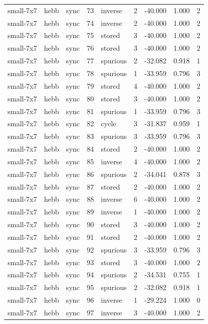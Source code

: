 \begin{tabular}{lllrlrrrr}
small-7x7 & hebb & sync & 73 & inverse & 2 & -40.000 & 1.000 & 2 \\
small-7x7 & hebb & sync & 74 & inverse & 2 & -40.000 & 1.000 & 2 \\
small-7x7 & hebb & sync & 75 & stored & 3 & -40.000 & 1.000 & 2 \\
small-7x7 & hebb & sync & 76 & stored & 3 & -40.000 & 1.000 & 2 \\
small-7x7 & hebb & sync & 77 & spurious & 2 & -32.082 & 0.918 & 1 \\
small-7x7 & hebb & sync & 78 & spurious & 1 & -33.959 & 0.796 & 3 \\
small-7x7 & hebb & sync & 79 & stored & 4 & -40.000 & 1.000 & 2 \\
small-7x7 & hebb & sync & 80 & stored & 3 & -40.000 & 1.000 & 2 \\
small-7x7 & hebb & sync & 81 & spurious & 1 & -33.959 & 0.796 & 3 \\
small-7x7 & hebb & sync & 82 & cycle & 3 & -31.837 & 0.959 & 1 \\
small-7x7 & hebb & sync & 83 & spurious & 3 & -33.959 & 0.796 & 3 \\
small-7x7 & hebb & sync & 84 & stored & 2 & -40.000 & 1.000 & 2 \\
small-7x7 & hebb & sync & 85 & inverse & 4 & -40.000 & 1.000 & 2 \\
small-7x7 & hebb & sync & 86 & spurious & 2 & -34.041 & 0.878 & 3 \\
small-7x7 & hebb & sync & 87 & stored & 2 & -40.000 & 1.000 & 2 \\
small-7x7 & hebb & sync & 88 & inverse & 6 & -40.000 & 1.000 & 2 \\
small-7x7 & hebb & sync & 89 & inverse & 1 & -40.000 & 1.000 & 2 \\
small-7x7 & hebb & sync & 90 & stored & 3 & -40.000 & 1.000 & 2 \\
small-7x7 & hebb & sync & 91 & stored & 2 & -40.000 & 1.000 & 2 \\
small-7x7 & hebb & sync & 92 & spurious & 3 & -33.959 & 0.796 & 3 \\
small-7x7 & hebb & sync & 93 & stored & 3 & -40.000 & 1.000 & 2 \\
small-7x7 & hebb & sync & 94 & spurious & 2 & -34.531 & 0.755 & 1 \\
small-7x7 & hebb & sync & 95 & spurious & 2 & -32.082 & 0.918 & 1 \\
small-7x7 & hebb & sync & 96 & inverse & 1 & -29.224 & 1.000 & 0 \\
small-7x7 & hebb & sync & 97 & inverse & 3 & -40.000 & 1.000 & 2 \\

\end{tabular}
